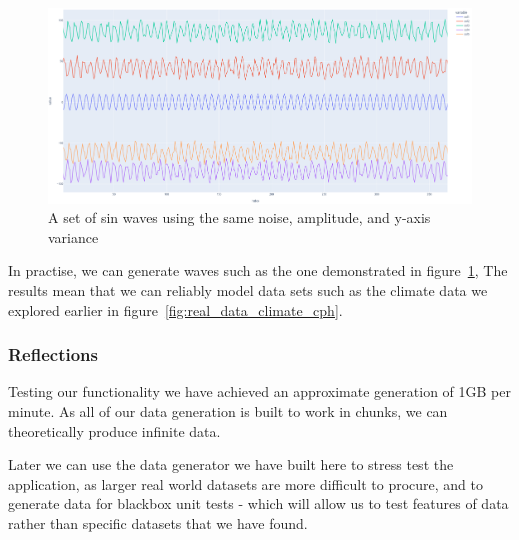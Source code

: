 \begin{figure}[H]
    \centering
    \includegraphics[width=12cm]{figures/data_generation/fake_data_sin_waves}
    \caption{A set of sin waves using the same noise, amplitude, and y-axis variance}
    \label{fig:datagen_fig_3}
\end{figure}

In practise, we can generate waves such as the one demonstrated in figure~\ref{fig:datagen_fig_3}, The results mean that
we can reliably model data sets such as the climate data we explored earlier in figure~\ref{fig:real_data_climate_cph}.

\subsubsection{Reflections}

Testing our functionality we have achieved an approximate generation of 1GB per minute.
As all of our data generation is built to work in chunks, we can theoretically produce infinite data.

Later we can use the data generator we have built here to stress test the application, as larger real world datasets are
more difficult to procure, and to generate data for blackbox unit tests - which will allow us to test features of data
rather than specific datasets that we have found.

